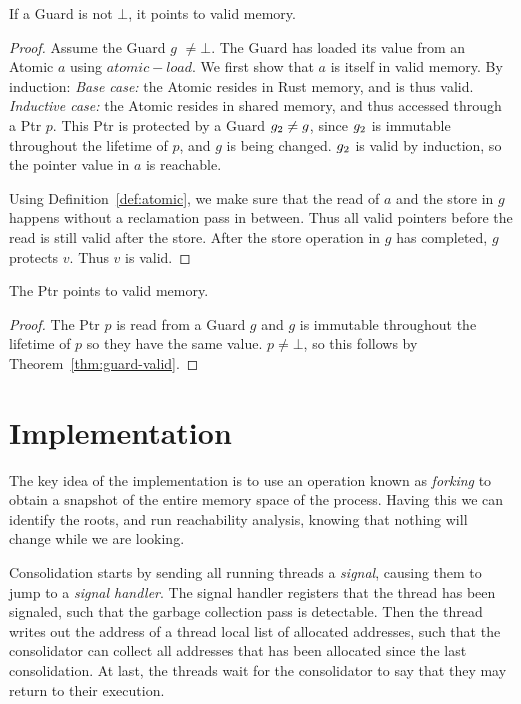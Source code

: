 \begin{theorem}\label{thm:guard-valid}
  If a Guard is not $\bot$, it points to valid memory.
\end{theorem}
\begin{proof}
  Assume the Guard $g$ $\neq \bot$.
  The Guard has loaded its value from an Atomic $a$ using $atomic-load$.
We first show that $a$ is itself in valid memory. By induction:
\emph{Base case:} the Atomic resides in Rust memory, and is thus valid. \emph{Inductive case:} the
Atomic resides in shared memory, and thus accessed through a Ptr $p$.  This Ptr is protected by a
Guard $g\sb{2} \neq g$, since $g\sb{2}$ is immutable throughout the lifetime of $p$, and $g$ is
being changed. $g\sb{2}$ is valid by induction, so the pointer value in $a$ is reachable.

Using Definition~\ref{def:atomic}, we make sure that the read of $a$ and the store in $g$ happens
without a reclamation pass in between. Thus all valid pointers before the read is still valid after
the store.  After the store operation in $g$ has completed, $g$ protects $v$. Thus $v$ is valid.
\end{proof}

\begin{lemma}\label{lm:ptr-valid}
  The Ptr points to valid memory.
\end{lemma}
\begin{proof}
The  Ptr $p$ is read from a Guard $g$ and $g$ is immutable throughout the lifetime of $p$ so they
have the same value. $p \neq \bot$, so this follows by Theorem~\ref{thm:guard-valid}.
\end{proof}




\section{Implementation}

The key idea of the implementation is to use an operation known as \emph{forking} to obtain a
snapshot of the entire memory space of the process. Having this we can identify the roots, and run
reachability analysis, knowing that nothing will change while we are looking.

Consolidation starts by sending all running threads a \emph{signal}, causing them to jump to a
\emph{signal handler}. The signal handler registers that the thread has been signaled, such that the
garbage collection pass is detectable. Then the thread writes out the address of a thread local
list of allocated addresses, such that the consolidator can collect all addresses that has been
allocated since the last consolidation. At last, the threads wait for the consolidator to say that
they may return to their execution. 


